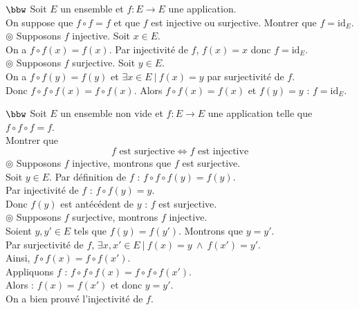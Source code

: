 \documentclass[11pt]{article}
\begin{document}
\begin{exercice}{$\bbw$}{}
    Soit $E$ un ensemble et $f:E\to E$ une application.\\
    On suppose que $f\circ f = f$ et que $f$ est injective ou surjective. Montrer que $f = \text{id}_E$.
    \tcblower
    $\circledcirc$ Supposons $f$ injective. Soit $x \in E$.\\
    On a $f \circ f (x) = f(x)$. Par injectivité de $f$, $f(x) = x$ donc $f = \text{id}_E$.\\[0.15cm]
    $\circledcirc$ Supposons $f$ surjective. Soit $y \in E$.\\
    On a $f \circ f (y) = f(y)$ et $\exists x \in E ~ | ~ f(x) = y$ par surjectivité de $f$.\\
    Donc $f \circ f \circ f (x) = f \circ f (x)$. Alors $f \circ f (x) = f(x)$ et $f(y) = y$ : $f = \text{id}_E$.
\end{exercice}

\begin{exercice}{$\bbw$}{}
    Soit $E$ un ensemble non vide et $f:E\to E$ une application telle que $f \circ f \circ f = f$.\\
    Montrer que
    \begin{equation*}
        f \text{ est surjective} \iff f \text{ est injective}
    \end{equation*}
    \tcblower
    $\circledcirc$ Supposons $f$ injective, montrons que $f$ est surjective.\\
    Soit $y \in E$. Par définition de $f$ : $f \circ f \circ f(y) = f(y)$.\\
    Par injectivité de $f$ : $f\circ f(y) = y$.\\
    Donc $f(y)$ est antécédent de $y$ : $f$ est surjective.\\[0.1cm]
    $\circledcirc$ Supposons $f$ surjective, montrons $f$ injective.\\
    Soient $y, y' \in E$ tels que $f(y) = f(y')$. Montrons que $y=y'$.\\
    Par surjectivité de $f$, $\exists x,x' \in E ~ | ~ f(x) = y ~ \wedge ~ f(x') = y'$.\\
    Ainsi, $f\circ f(x) = f \circ f (x')$.\\
    Appliquons $f$ : $f \circ f \circ f(x) = f \circ f \circ f(x')$.\\
    Alors : $f(x) = f(x')$ et donc $y = y'$.\\
    On a bien prouvé l'injectivité de $f$.
\end{exercice}
\end{document}
